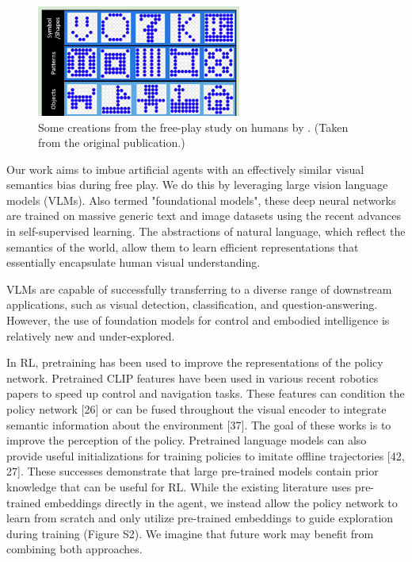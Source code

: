 \begin{figure}[h]
    \centering
    \includegraphics[width=0.6\textwidth]{images/diggs.png}
    \caption{Some creations from the free-play study on humans by \cite{diggs}. (Taken from the original publication.)}
    \label{fig:diggs}
\end{figure}


Our work aims to imbue artificial agents with an effectively similar visual semantics bias during free play.
We do this by leveraging large vision language models (VLMs).
Also termed "foundational models", these deep neural networks are trained on massive generic text and image datasets using the recent advances in self-supervised learning. 
The abstractions of natural language, which reflect the semantics of the world, allow them to learn efficient representations that essentially encapsulate human visual understanding.

VLMs are capable of successfully transferring to a diverse range of downstream applications, such as visual detection, classification, and question-answering.
However, the use of foundation models for control and embodied intelligence is relatively new and under-explored.

In RL, pretraining has been used to improve the representations of the policy network. 
Pretrained CLIP features have been used in various recent robotics papers to speed up control and navigation tasks.
These features can condition the policy network [26] or can be fused throughout the visual encoder to integrate semantic information about the environment [37]. 
The goal of these works is to improve the perception of the policy.
Pretrained language models can also provide useful initializations for training policies to imitate offline trajectories [42, 27].
These successes demonstrate that large pre-trained models contain prior knowledge that can be useful for RL. While the existing literature uses pre-trained embeddings directly in the agent, we instead allow the policy network to learn from scratch and only utilize pre-trained embeddings to guide exploration during training (Figure S2).
We imagine that future work may benefit from combining both approaches.

